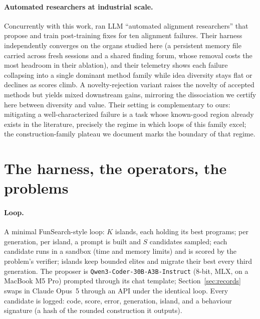 \documentclass[11pt]{article}
\begin{document}
\paragraph{Automated researchers at industrial scale.} Concurrently with
this work, \citet{chen2026automated} ran LLM ``automated alignment
researchers'' that propose and train post-training fixes for ten
alignment failures. Their harness independently converges on the organs
studied here (a persistent memory file carried across fresh sessions
and a shared finding forum, whose removal costs the most headroom in
their ablation), and their telemetry shows each failure collapsing into
a single dominant method family while idea diversity stays flat or
declines as scores climb. A novelty-rejection variant raises the novelty
of accepted methods but yields mixed downstream gains, mirroring the
dissociation we certify here between diversity and value. Their setting
is complementary to ours: mitigating a well-characterized failure is a
task whose known-good region already exists in the literature, precisely
the regime in which loops of this family excel; the construction-family
plateau we document marks the boundary of that regime.

\section{The harness, the operators, the problems}
\label{sec:harness}

\paragraph{Loop.} A minimal FunSearch-style loop: $K$ islands, each holding
its best programs; per generation, per island, a prompt is built and $S$
candidates sampled; each candidate runs in a sandbox (time and memory
limits) and is scored by the problem's verifier; islands keep bounded
elites and migrate their best every third generation. The proposer is
\texttt{Qwen3-Coder-30B-A3B-Instruct} (8-bit, MLX, on a MacBook M5 Pro)
prompted through its chat template; Section~\ref{sec:records} swaps in
Claude Opus~5 through an API under the identical loop. Every candidate is
logged: code, score, error, generation, island, and a behaviour signature
(a hash of the rounded construction it outputs).
\end{document}
